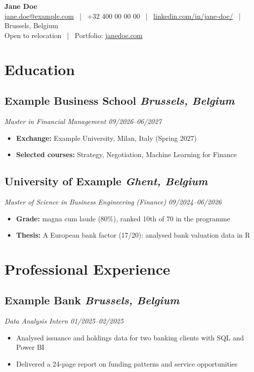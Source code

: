 \documentclass[a4paper,10pt]{article}
\begin{document}
\begin{center}
    {\huge \textbf{Jane Doe}}\\
    \vspace{1mm}
    \small
    \href{mailto:jane.doe@example.com}{jane.doe@example.com} \, | \,
    +32 400 00 00 00 \, | \,
    \href{https://linkedin.com/in/jane-doe/}{linkedin.com/in/jane-doe/} \, | \,
    Brussels, Belgium\\
    Open to relocation \, | \,
    Portfolio: \href{https://janedoe.com}{janedoe.com}
\end{center}

\section*{Education}

\subsection*{Example Business School \hfill \normalfont\textit{Brussels, Belgium}}
\textit{Master in Financial Management \hfill 09/2026--06/2027}
\begin{itemize}
    \item \textbf{Exchange:} Example University, Milan, Italy (Spring 2027)
    \item \textbf{Selected courses:} Strategy, Negotiation, Machine Learning for Finance
\end{itemize}

\subsection*{University of Example \hfill \normalfont\textit{Ghent, Belgium}}
\textit{Master of Science in Business Engineering (Finance) \hfill 09/2024--06/2026}
\begin{itemize}
    \item \textbf{Grade:} magna cum laude (80\%), ranked 10th of 70 in the programme
    \item \textbf{Thesis:} A European bank factor (17/20): analysed bank valuation data in R
\end{itemize}

\section*{Professional Experience}

\subsection*{Example Bank \hfill \normalfont\textit{Brussels, Belgium}}
\textit{Data Analysis Intern \hfill 01/2025--02/2025}
\begin{itemize}
    \item Analysed issuance and holdings data for two banking clients with SQL and Power BI
    \item Delivered a 24-page report on funding patterns and service opportunities
\end{itemize}
\end{document}
